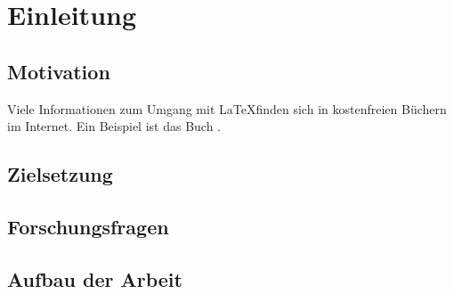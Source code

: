 \chapter{Einleitung}

\section{Motivation}

Viele Informationen zum Umgang mit \LaTeX finden sich in kostenfreien Büchern im Internet. Ein Beispiel ist das Buch  \autocite{oetiker_2022}.

\lipsum[1]

\section{Zielsetzung}

\lipsum[2]

\section{Forschungsfragen}

\lipsum[3]

\section{Aufbau der Arbeit}

\lipsum[4-8]